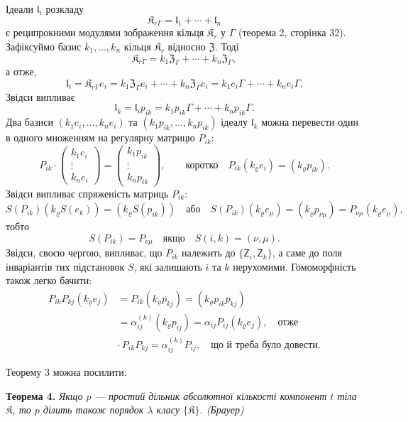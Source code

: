 \documentclass[11pt]{article}
\begin{document}
Ідеали \(\mathfrak l_i\) розкладу
\[
\mathfrak K_{r\Gamma}=\mathfrak l_1+\cdots+\mathfrak l_n
\]
є реципрокними модулями зображення кільця \(\mathfrak K_r\) у \(\Gamma\) (теорема 2, сторінка 32). Зафіксуймо базис \(k_1,\ldots,k_n\) кільця \(\mathfrak K_r\) відносно \(\mathfrak Z\). Тоді
\[
\mathfrak K_{r\Gamma}=k_1\mathfrak Z_\Gamma+\cdots+k_n\mathfrak Z_\Gamma,
\]
а отже,
\[
\mathfrak l_i=\mathfrak K_{r\Gamma}e_i
=k_1\mathfrak Z_\Gamma e_i+\cdots+k_n\mathfrak Z_\Gamma e_i
=k_1e_i\Gamma+\cdots+k_ne_i\Gamma.
\]
Звідси випливає
\[
\mathfrak l_k=\mathfrak l_i p_{ik}
=k_1p_{ik}\Gamma+\cdots+k_np_{ik}\Gamma.
\]
Два базиси \((k_1e_i,\ldots,k_ne_i)\) та \((k_1p_{ik},\ldots,k_np_{ik})\) ідеалу \(\mathfrak l_k\) можна перевести один в одного множенням на регулярну матрицю \(P_{ik}\):
\[
P_{ik}\cdot
\begin{pmatrix}
k_1e_i\\ \vdots\\ k_ne_i
\end{pmatrix}
=
\begin{pmatrix}
k_1p_{ik}\\ \vdots\\ k_np_{ik}
\end{pmatrix},
\qquad
\text{коротко}\quad
P_{ik}(k_\varrho e_i)=(k_\varrho p_{ik}).
\]
Звідси випливає спряженість матриць \(P_{ik}\):
\[
S(P_{ik})(k_\varrho S(e_k))=(k_\varrho S(p_{ik}))
\quad\text{або}\quad
S(P_{ik})(k_\varrho e_\mu)=(k_\varrho p_{\nu\mu})
=P_{\nu\mu}(k_\varrho e_\mu),
\]
тобто
\[
S(P_{ik})=P_{\nu\mu}\quad\text{якщо}\quad S(i,k)=(\nu,\mu).
\]
Звідси, своєю чергою, випливає, що \(P_{ik}\) належить до \(\{\mathsf{Z}_i,\mathsf{Z}_k\}\), а саме до поля інваріантів тих підстановок \(S\), які залишають \(i\) та \(k\) нерухомими. Гомоморфність також легко бачити:
\[
\begin{split}
P_{ik}P_{kj}(k_\varrho e_j)
&=P_{ik}(k_\varrho p_{kj})
=(k_\varrho p_{ik}p_{kj})\\
&=\alpha_{ij}^{(k)}(k_\varrho p_{ij})
=\alpha_{ij}P_{ij}(k_\varrho e_j),
\quad\text{отже}\\
&\cdot\, P_{ik}P_{kj}=\alpha_{ij}^{(k)}P_{ij},
\quad\text{що й треба було довести.}
\end{split}
\]

Теорему 3 можна посилити:

\textbf{Теорема 4.} \emph{Якщо \(p\) --- простий дільник абсолютної кількості компонент \(t\) тіла \(\mathfrak K\), то \(p\) ділить також порядок \(\lambda\) класу \(\{\mathfrak K\}\). (Брауер)}
\end{document}
